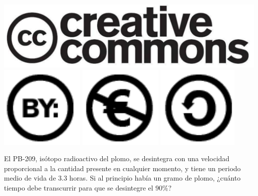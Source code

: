 \documentclass[aspectratio=149,10pt,xcolor=dvipsnames,t]{beamer}
\begin{document}
\begin{frame}[c]
\begin{center}
\biskip
\includegraphics[scale=0.07]{img/cc-logo}
\includegraphics[scale=0.2]{img/cc-by}
\includegraphics[scale=0.2]{img/cc-e}
\includegraphics[scale=0.2]{img/cc-c}
\end{center}
\end{frame}

\begin{frame}[c]
\Large
El PB-209, isótopo radioactivo del plomo, se desintegra con una velocidad proporcional a la cantidad presente en cualquier
momento, y tiene un periodo medio de vida de $3.3$ horas. 
Si al principio había un gramo de plomo, ¿cuánto tiempo debe transcurrir para que se desintegre el $90\%$?
\end{frame}
\end{document}
